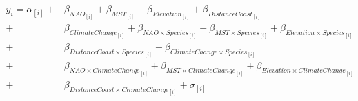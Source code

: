 \documentclass{article}\usepackage[]{graphicx}\usepackage[]{color}
\begin{document}
{\begin{align*}
y_i = \alpha_{[i]} +&  \beta_{NAO_{[i]}} + \beta_{MST_{[i]}} + \beta_{Elevation_{[i]}} + \beta_{DistanceCoast_{[i]}} \\ +& \beta_{ClimateChange_{[i]}}
+ \beta_{NAO \times Species_{[i]}} + \beta_{MST \times Species_{[i]}} + \beta_{Elevation \times Species_{[i]}} \\ +& \beta_{DistanceCoast \times Species_{[i]}} + \beta_{ClimateChange \times Species_{[i]}} \\
+& \beta_{NAO \times ClimateChange_{[i]}} + \beta_{MST \times ClimateChange_{[i]}} 
+ \beta_{Elevation \times ClimateChange_{[i]}} \\ +& \beta_{DistanceCoast \times ClimateChange_{[i]}} + \sigma_{[i]} \tag{S1}
\end{align*}


}
\end{document}

